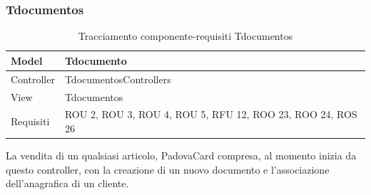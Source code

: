 



\subsubsection{Tdocumentos}
\def\arraystretch{2}
\begin{table}[H]
\centering
\begin{tabular}{|l|l|}
\hline
Model & Tdocumento \\ \hline
Controller & TdocumentosControllers \\ \hline
View & Tdocumentos \\ \hline
Requisiti & ROU 2, ROU 3, ROU 4, ROU 5, RFU 12, ROO 23, ROO 24, ROS 26 \\ \hline
\end{tabular}
\caption{Tracciamento componente-requisiti Tdocumentos}
\end{table}

La vendita di un qualsiasi articolo, PadovaCard compresa, al momento inizia da questo controller, con la creazione di un nuovo documento e l'associazione dell'anagrafica di un cliente. \\

